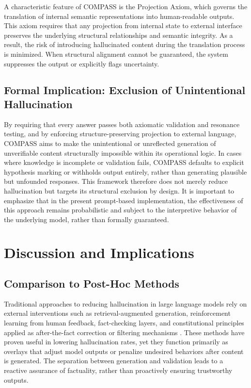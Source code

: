 \documentclass[11pt,a4paper]{article}
\begin{document}
A characteristic feature of COMPASS is the Projection Axiom, which governs the translation of internal semantic representations into human-readable outputs. This axiom requires that any projection from internal state to external interface preserves the underlying structural relationships and semantic integrity. As a result, the risk of introducing hallucinated content during the translation process is minimized. When structural alignment cannot be guaranteed, the system suppresses the output or explicitly flags uncertainty.

\subsection{Formal Implication: Exclusion of Unintentional Hallucination}

By requiring that every answer passes both axiomatic validation and resonance testing, and by enforcing structure-preserving projection to external language, COMPASS aims to make the unintentional or unreflected generation of unverifiable content structurally impossible within its operational logic. In cases where knowledge is incomplete or validation fails, COMPASS defaults to explicit hypothesis marking or withholds output entirely, rather than generating plausible but unfounded responses. This framework therefore does not merely reduce hallucination but targets its structural exclusion by design. It is important to emphasize that in the present prompt-based implementation, the effectiveness of this approach remains probabilistic and subject to the interpretive behavior of the underlying model, rather than formally guaranteed.

\section{Discussion and Implications}

\subsection{Comparison to Post-Hoc Methods}

Traditional approaches to reducing hallucination in large language models rely on external interventions such as retrieval-augmented generation, reinforcement learning from human feedback, fact-checking layers, and constitutional principles applied as after-the-fact correction or filtering mechanisms \cite{lewis2020retrieval,ouyang2022training,bai2022constitutional}. These methods have proven useful in lowering hallucination rates, yet they function primarily as overlays that adjust model outputs or penalize undesired behaviors after content is generated. The separation between generation and validation leads to a reactive assurance of factuality, rather than proactively ensuring trustworthy outputs.
\end{document}
